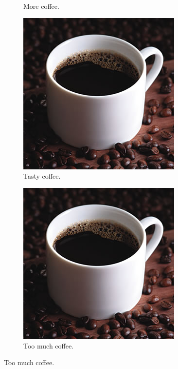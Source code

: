 \begin{figure}[ht!]
\begin{subfigure}[b]{0.2\linewidth}
		\caption{More coffee.}
	\end{subfigure}
	\begin{subfigure}[b]{0.2\linewidth}
		\includegraphics[width=\linewidth]{2-textuais/figs/coffee.jpg}
		\caption{Tasty coffee.}
	\end{subfigure}
    \begin{subfigure}[b]{0.5\linewidth}
		\includegraphics[width=\linewidth]{2-textuais/figs/coffee.jpg}
		\caption{Too much coffee.}
	\end{subfigure}
	\label{fig:coffee3}
\end{figure}